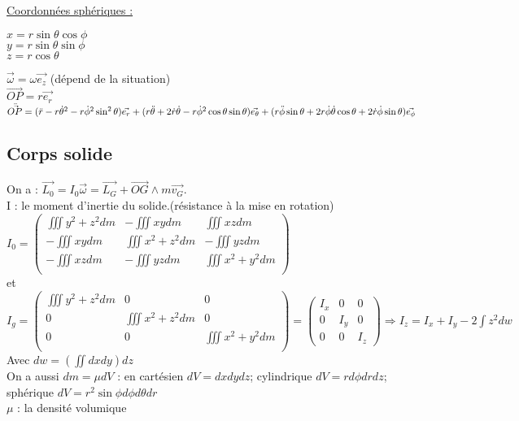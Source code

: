\documentclass[../main.tex]{subfiles}
\begin{document}
\quad \underline{Coordonnées sphériques :}\\
\begin{minipage}{.15\textwidth}
    $x = r \sin{\theta} \cos{\phi}$\\
    $y = r \sin{\theta} \sin{\phi}$\\
    $z = r \cos{\theta}$\\
\end{minipage}
\vline
\begin{minipage}{.85\textwidth}
    $\vec{\omega} = \omega \vec{e_z}$ (dépend de la situation)\\
    $\vec{OP} = r \vec{e_r}$\\
    $\Ddot{\vec{OP}} = (\Ddot{r} - r \dot{\theta}^2 - r \dot{\phi}^2 \sin^2 \theta) \vec{e_r} + (r \Ddot{\theta} + 2 \dot{r} \dot{\theta} - r \dot{\phi}^2 \cos{\theta} \sin{\theta}) \vec{e_{\theta}} +(r \Ddot{\phi} \sin{\theta} + 2r\dot{\phi} \dot{\theta} \cos{\theta} + 2 \dot{r} \dot{\phi} \sin{\theta})\vec{e_{\phi}}$
\end{minipage}


\subsection{Corps solide}
On a : $\vec{L_0} = I_0 \vec{\omega} = \vec{L_G} + \vec{OG} \wedge m \vec{v_G}$.\\
I : le moment d'inertie du solide.(résistance à la mise en rotation)\\

$I_0 = \begin{pmatrix}
    \iiint y^2 + z^2dm & -\iiint xydm & \iiint xzdm\\
    -\iiint xydm & \iiint x^2 + z^2 dm & -\iiint yzdm\\
    -\iiint xzdm & -\iiint yzdm & \iiint x^2 + y^2 dm\\
\end{pmatrix}$\\
 et $I_g = \begin{pmatrix}
     \iiint y^2+z^2dm & 0&0\\
     0 & \iiint x^2+z^2dm & 0\\
     0 &0 &\iiint x^2+y^2dm\\
 \end{pmatrix} = \begin{pmatrix}
     I_x &0&0\\
     0&I_y&0\\
     0&0&I_z
 \end{pmatrix} \Rightarrow I_z = I_x + I_y - 2 \int z^2dw$ \\
 Avec $dw = (\iint dxdy)dz$\\
On a aussi $dm = \mu dV$ : en cartésien $dV = dxdydz$; cylindrique $dV = r d\phi dr dz$; sphérique $dV = r^2 \sin{\phi} d\phi d\theta dr$\\
$\mu$ : la densité volumique
\end{document}
